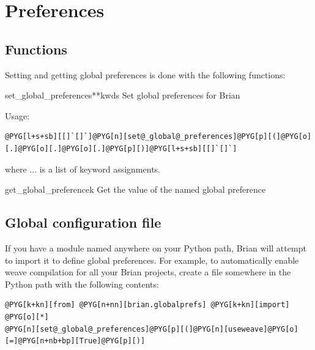 \documentclass[letterpaper,10pt,english]{manual}
\begin{document}
\resetcurrentobjects
\hypertarget{--doc-reference-preferences}{}

\hypertarget{preferences}{}\section{Preferences}


\subsection{Functions}

Setting and getting global preferences is done with the following
functions:

\hypertarget{brian.set_global_preferences}{}\begin{funcdesc}{set\_global\_preferences}{**kwds}
Set global preferences for Brian

Usage:

\begin{Verbatim}[commandchars=@\[\]]
@PYG[l+s+sb][[]`[]`]@PYG[n][set@_global@_preferences]@PYG[p][(]@PYG[o][.]@PYG[o][.]@PYG[o][.]@PYG[p][)]@PYG[l+s+sb][[]`[]`]
\end{Verbatim}

where ... is a list of keyword assignments.
\end{funcdesc}

\hypertarget{brian.get_global_preference}{}\begin{funcdesc}{get\_global\_preference}{k}
Get the value of the named global preference
\end{funcdesc}


\subsection{Global configuration file}

If you have a module named  anywhere on your Python path,
Brian will attempt to import it to define global preferences. For example, to
automatically enable weave compilation for all your Brian projects, create a
file  somewhere in the Python path with the following
contents:

\begin{Verbatim}[commandchars=@\[\]]
@PYG[k+kn][from] @PYG[n+nn][brian.globalprefs] @PYG[k+kn][import] @PYG[o][*]
@PYG[n][set@_global@_preferences]@PYG[p][(]@PYG[n][useweave]@PYG[o][=]@PYG[n+nb+bp][True]@PYG[p][)]
\end{Verbatim}
\end{document}
